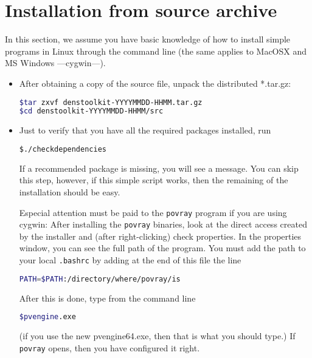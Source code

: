 \section{Installation from source archive}

In this section, we assume you have basic knowledge of how to install simple programs in Linux through the command line (the same applies to MacOSX and MS Windows ---cygwin---).

\begin{itemize}
\item After obtaining a copy of the source file, unpack the distributed *.tar.gz:
\begin{lstlisting}[language=bash]
$tar zxvf denstoolkit-YYYYMMDD-HHMM.tar.gz
$cd denstoolkit-YYYYMMDD-HHMM/src
\end{lstlisting}
\item Just to verify that you have all the required packages installed, run
\begin{lstlisting}[language=bash]
$./checkdependencies
\end{lstlisting}
 If a recommended package is missing, you will see a message. You can skip this step, however, if this simple script works, then the remaining of the installation should be easy.
 
 Especial attention must be paid to the \texttt{povray} program if you are using cygwin: After installing the \texttt{povray} binaries, look at the direct access created by the installer and (after right-clicking) check properties. In the properties window, you can see the full path of the program. You must add the path to your local \texttt{.bashrc} by adding at the end of this file the line
\begin{lstlisting}[language=bash]
PATH=$PATH:/directory/where/povray/is
\end{lstlisting}
After this is done, type from the command line
\begin{lstlisting}[language=bash]
$pvengine.exe
\end{lstlisting}
(if you use the new pvengine64.exe, then that is what you should type.) If \texttt{povray} opens, then you have configured it right.


\end{itemize}
